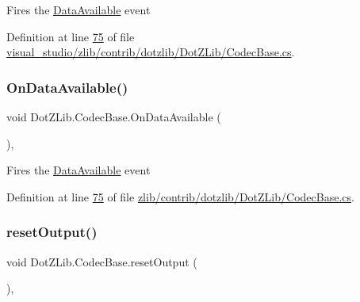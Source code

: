 Fires the \hyperlink{class_dot_z_lib_1_1_codec_base_ad7ec5a193ad07d7c91d2538c51eb33c1}{Data\+Available} event 



Definition at line \hyperlink{visual__studio_2zlib_2contrib_2dotzlib_2_dot_z_lib_2_codec_base_8cs_source_l00075}{75} of file \hyperlink{visual__studio_2zlib_2contrib_2dotzlib_2_dot_z_lib_2_codec_base_8cs_source}{visual\+\_\+studio/zlib/contrib/dotzlib/\+Dot\+Z\+Lib/\+Codec\+Base.\+cs}.

\mbox{\label{class_dot_z_lib_1_1_codec_base_a5c697195bc017ae951858e7c8948f9ae}} 
\subsubsection{\texorpdfstring{On\+Data\+Available()}{OnDataAvailable()}\hspace{0.1cm}{\footnotesize\ttfamily [2/2]}}
{\footnotesize\ttfamily void Dot\+Z\+Lib.\+Codec\+Base.\+On\+Data\+Available (\begin{DoxyParamCaption}{ }\end{DoxyParamCaption})\hspace{0.3cm}{\ttfamily [inline]}, {\ttfamily [protected]}}



Fires the \hyperlink{class_dot_z_lib_1_1_codec_base_ad7ec5a193ad07d7c91d2538c51eb33c1}{Data\+Available} event 



Definition at line \hyperlink{zlib_2contrib_2dotzlib_2_dot_z_lib_2_codec_base_8cs_source_l00075}{75} of file \hyperlink{zlib_2contrib_2dotzlib_2_dot_z_lib_2_codec_base_8cs_source}{zlib/contrib/dotzlib/\+Dot\+Z\+Lib/\+Codec\+Base.\+cs}.

\mbox{\label{class_dot_z_lib_1_1_codec_base_a801b625073b21aeaab52ebf9e96dd9c9}} 
\subsubsection{\texorpdfstring{reset\+Output()}{resetOutput()}\hspace{0.1cm}{\footnotesize\ttfamily [1/2]}}
{\footnotesize\ttfamily void Dot\+Z\+Lib.\+Codec\+Base.\+reset\+Output (\begin{DoxyParamCaption}{ }\end{DoxyParamCaption})\hspace{0.3cm}{\ttfamily [inline]}, {\ttfamily [protected]}}



